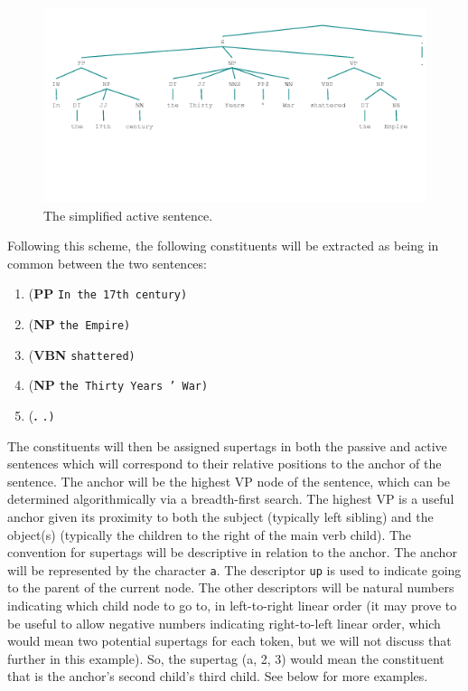 \documentclass{article}
\begin{document}
\begin{figure}
\begin{center}
\includegraphics[scale=.65]{tree1}
\caption{The simplified active sentence.}
\end{center}
\end{figure}

Following this scheme, the following constituents will be extracted as being in common between the two sentences:

\begin{enumerate}
\item (\textbf{PP} \texttt{In the 17th century)}
\item (\textbf{NP} \texttt{the Empire)}
\item (\textbf{VBN} \texttt{shattered)}
\item (\textbf{NP} \texttt{the Thirty Years ' War)}
\item (\textbf{.} \texttt{.)}
\end{enumerate}

The constituents will then be assigned supertags in both the passive and active sentences which will correspond to their relative positions to the anchor of the sentence. The anchor will be the highest VP node of the sentence, which can be determined algorithmically via a breadth-first search. The highest VP is a useful anchor given its proximity to both the subject (typically left sibling) and the object(s) (typically the children to the right of the main verb child). The convention for supertags will be descriptive in relation to the anchor. The anchor will be represented by the character \texttt{a}. The descriptor \texttt{up} is used to indicate going to the parent of the current node. The other descriptors will be natural numbers indicating which child node to go to, in left-to-right linear order (it may prove to be useful to allow negative numbers indicating right-to-left linear order, which would mean two potential supertags for each token, but we will not discuss that further in this example). So, the supertag (a, 2, 3) would mean the constituent that is the anchor's second child's third child. See below for more examples.	
\end{document}
